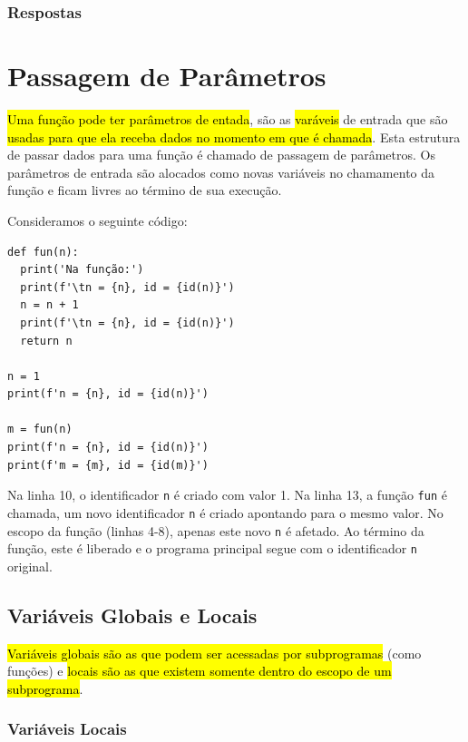 \ifisbook
\subsubsection{Respostas}
\shipoutAnswer
\fi


\section{Passagem de Parâmetros}\label{cap_fun_sec_params}

\hl{Uma função pode ter parâmetros de entada}, são as \hl{varáveis} de entrada que são \hl{usadas para que ela receba dados no momento em que é chamada}. Esta estrutura de passar dados para uma função é chamado de passagem de parâmetros. Os parâmetros de entrada são alocados como novas variáveis no chamamento da função e ficam livres ao término de sua execução.

\begin{ex}
  Consideramos o seguinte código:

\begin{lstlisting}
def fun(n):
  print('Na função:')
  print(f'\tn = {n}, id = {id(n)}')
  n = n + 1
  print(f'\tn = {n}, id = {id(n)}')
  return n

n = 1
print(f'n = {n}, id = {id(n)}')

m = fun(n)
print(f'n = {n}, id = {id(n)}')
print(f'm = {m}, id = {id(m)}')
\end{lstlisting}
  
Na linha 10, o identificador \lstinline+n+ é criado com valor 1. Na linha 13, a função \lstinline+fun+ é chamada, um novo identificador \lstinline+n+ é criado apontando para o mesmo valor. No escopo da função (linhas 4-8), apenas este novo \lstinline+n+ é afetado. Ao término da função, este é liberado e o programa principal segue com o identificador \lstinline+n+ original.
\end{ex}

\subsection{Variáveis Globais e Locais}

\hl{Variáveis globais são as que podem ser acessadas por subprogramas} (como funções) e \hl{locais são as que existem somente dentro do escopo de um subprograma}.

\subsubsection{Variáveis Locais}

